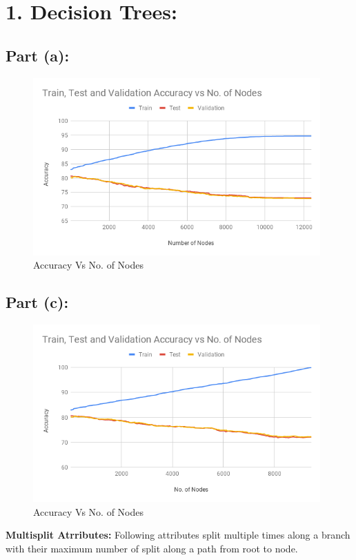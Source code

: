 \documentclass[a4 paper]{article}
\begin{document}

\section*{1. Decision Trees:}

\subsection*{Part (a):}
\begin{figure}[ht!]
	\centering %
	\includegraphics[width=110mm]{./chart/DT_a.png}
	\caption{Accuracy Vs No. of Nodes}
\end{figure}

\subsection*{Part (c):}
\begin{figure}[ht!]
	\centering %
	\includegraphics[width=110mm]{./chart/DT_c.png}
	\caption{Accuracy Vs No. of Nodes}
\end{figure}

\textbf{Multisplit Atrributes:}
Following attributes split multiple times along a branch with their maximum number of split along a path from root to node.
\end{document}
